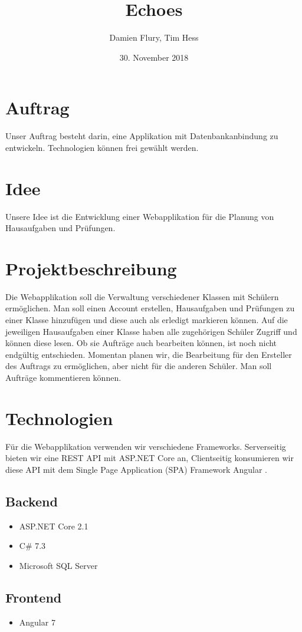 \documentclass[a4paper, titlepage]{article}
\title{Echoes}
\author{Damien Flury, Tim Hess}
\date{30. November 2018}
\begin{document}
    \maketitle
    \tableofcontents
    \newpage

    \section{Auftrag}
    Unser Auftrag besteht darin, eine Applikation mit Datenbankanbindung zu entwickeln. Technologien
    können frei gewählt werden.
    \section{Idee}
    Unsere Idee ist die Entwicklung einer Webapplikation für die Planung von Hausaufgaben
    und Prüfungen. 
    \section{Projektbeschreibung}
    Die Webapplikation soll die Verwaltung verschiedener Klassen mit Schülern ermöglichen.
    Man soll einen Account erstellen, Hausaufgaben und Prüfungen zu einer Klasse hinzufügen
    und diese auch als erledigt markieren können. Auf die jeweiligen Hausaufgaben einer Klasse
    haben alle zugehörigen Schüler Zugriff und können diese lesen. Ob sie Aufträge auch bearbeiten
    können, ist noch nicht endgültig entschieden. Momentan planen wir, die Bearbeitung für den Ersteller
    des Auftrags zu ermöglichen, aber nicht für die anderen Schüler. Man soll Aufträge kommentieren
    können.
    \section{Technologien}
    Für die Webapplikation verwenden wir verschiedene Frameworks. Serverseitig bieten wir
    eine REST API mit ASP.NET Core \cite{Dotnet} an, Clientseitig konsumieren wir diese API mit dem Single
    Page Application (SPA) Framework Angular \cite{Angular}.
    \subsection{Backend}
    \begin{itemize}
        \item ASP.NET Core 2.1
        \item C\# 7.3
        \item Microsoft SQL Server
    \end{itemize}
    \subsection{Frontend}
    \begin{itemize}
    \item Angular 7
    \end{itemize}
\end{document}
